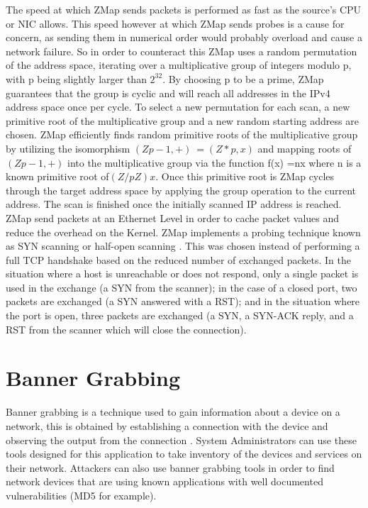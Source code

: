 \documentclass[a4wide,leqno,12pt]{report}
\begin{document}
The speed at which ZMap sends packets is performed as fast as the source's CPU or NIC allows. This speed however at which ZMap sends probes is a cause for concern, as sending them in numerical order would probably overload and cause a network failure. So in order to counteract this ZMap uses a random permutation of the address space, iterating over a multiplicative group of integers modulo p, with p being slightly larger than $2^{32}$. By choosing p to be a prime, ZMap guarantees that the group is cyclic and
will reach all addresses in the IPv4 address space once per cycle. To select a new permutation for each scan, a new primitive root of the multiplicative group and a new random starting address are chosen. ZMap efficiently finds random primitive roots of
the  multiplicative  group  by  utilizing  the  isomorphism $(Zp - 1,+)~=(Z*p,x)$ and  mapping  roots of$(Zp-1,+)$ into the multiplicative group via the  function f(x) =nx where n is a known primitive root of$(Z/pZ)x$. Once this primitive root is ZMap cycles through the target address space by applying the group operation to the current address. The scan is finished once the initially scanned IP address is reached\cite{durumeric2013zmap}.\\

ZMap send packets at an Ethernet Level in order to cache packet values and reduce the overhead on the Kernel.
ZMap implements a probing technique known as
SYN scanning or half-open scanning \cite{durumeric2013zmap}. This was chosen instead of performing a full TCP handshake
based on the reduced number of exchanged packets. In
the situation where a host is unreachable or does
not respond, only a single packet is used in the exchange (a SYN from
the scanner); in the case of a closed port, two packets
are exchanged (a SYN answered with a RST); and in the
situation where the port is open, three packets are
exchanged (a SYN, a SYN-ACK reply, and a RST from
the scanner which will close the connection)\cite{durumeric2013zmap}.

\section{Banner Grabbing}
Banner grabbing is a technique used to gain information about a device on a network, this is obtained by establishing a connection with the device and observing the output from the connection \cite{kondo2014penetration}. System Administrators can use these tools designed for this application to take inventory of the devices and services on their network. Attackers can also use banner grabbing tools in order to find network devices that are using known applications with well documented vulnerabilities (MD5 for example).
\end{document}
